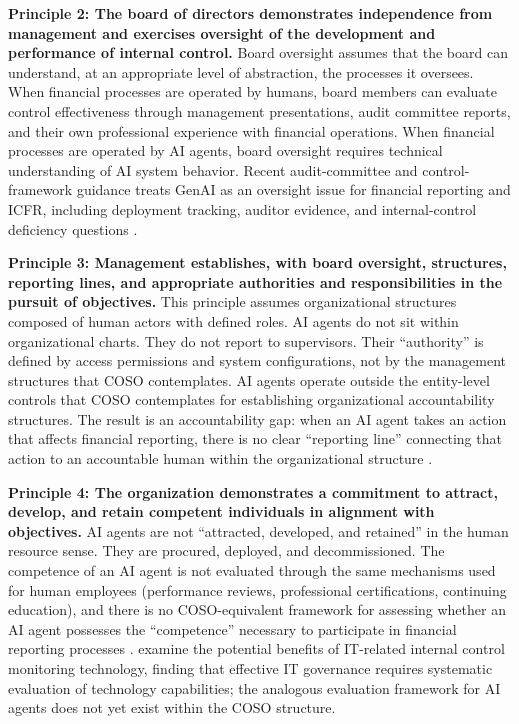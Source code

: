 \documentclass[12pt]{article}
\begin{document}
\textbf{Principle 2: The board of directors demonstrates independence from management and exercises oversight of the development and performance of internal control.} Board oversight assumes that the board can understand, at an appropriate level of abstraction, the processes it oversees. When financial processes are operated by humans, board members can evaluate control effectiveness through management presentations, audit committee reports, and their own professional experience with financial operations. When financial processes are operated by AI agents, board oversight requires technical understanding of AI system behavior. Recent audit-committee and control-framework guidance treats GenAI as an oversight issue for financial reporting and ICFR, including deployment tracking, auditor evidence, and internal-control deficiency questions \citep{caq2024genai, coso2026genai}.

\textbf{Principle 3: Management establishes, with board oversight, structures, reporting lines, and appropriate authorities and responsibilities in the pursuit of objectives.} This principle assumes organizational structures composed of human actors with defined roles. AI agents do not sit within organizational charts. They do not report to supervisors. Their ``authority'' is defined by access permissions and system configurations, not by the management structures that COSO contemplates. AI agents operate outside the entity-level controls that COSO contemplates for establishing organizational accountability structures. The result is an accountability gap: when an AI agent takes an action that affects financial reporting, there is no clear ``reporting line'' connecting that action to an accountable human within the organizational structure \citep{yeung2018}.

\textbf{Principle 4: The organization demonstrates a commitment to attract, develop, and retain competent individuals in alignment with objectives.} AI agents are not ``attracted, developed, and retained'' in the human resource sense. They are procured, deployed, and decommissioned. The competence of an AI agent is not evaluated through the same mechanisms used for human employees (performance reviews, professional certifications, continuing education), and there is no COSO-equivalent framework for assessing whether an AI agent possesses the ``competence'' necessary to participate in financial reporting processes \citep{akhtar2023}. \citet{masli2010} examine the potential benefits of IT-related internal control monitoring technology, finding that effective IT governance requires systematic evaluation of technology capabilities; the analogous evaluation framework for AI agents does not yet exist within the COSO structure.
\end{document}
